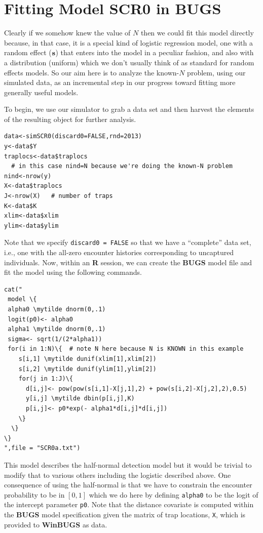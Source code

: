 \section{Fitting Model SCR0 in BUGS}
\label{scr0.sec.winbugs1}

Clearly if we somehow knew the value of $N$ then we could fit this
model directly because, in that case, it is a special kind of logistic
regression model, one with a random effect (${\bf s}$) that enters into the
model in a peculiar fashion, and also with a distribution (uniform)
which we don't usually think of as standard for random effects models.
So our aim here is to analyze the known-$N$ problem, using our
simulated data, as an incremental step in our progress toward fitting
more generally useful models.

To begin, we use our simulator to grab a data set and then harvest the
elements of the resulting object for further analysis.
\begin{verbatim}
data<-simSCR0(discard0=FALSE,rnd=2013)
y<-data$Y
traplocs<-data$traplocs
  # in this case nind=N because we're doing the known-N problem
nind<-nrow(y)
X<-data$traplocs
J<-nrow(X)   # number of traps
K<-data$K
xlim<-data$xlim
ylim<-data$ylim
\end{verbatim}

Note that we specify \mbox{\tt discard0 = FALSE} so that we have a
``complete'' data set, i.e., one with the all-zero encounter histories
corresponding to uncaptured individuals. Now, within an {\bf R} session, we
can create the {\bf BUGS} model file and fit the model using the following
commands.
{\small
\begin{Verbatim}[commandchars=\\\{\}]
cat("
 model \{
 alpha0 \mytilde dnorm(0,.1)
 logit(p0)<- alpha0
 alpha1 \mytilde dnorm(0,.1)
 sigma<- sqrt(1/(2*alpha1))
 for(i in 1:N)\{  # note N here because N is KNOWN in this example
    s[i,1] \mytilde dunif(xlim[1],xlim[2])
    s[i,2] \mytilde dunif(ylim[1],ylim[2])
    for(j in 1:J)\{
      d[i,j]<- pow(pow(s[i,1]-X[j,1],2) + pow(s[i,2]-X[j,2],2),0.5)
      y[i,j] \mytilde dbin(p[i,j],K)
      p[i,j]<- p0*exp(- alpha1*d[i,j]*d[i,j])
    \}
  \}
\}
",file = "SCR0a.txt")
\end{Verbatim}
}
This model describes the half-normal detection model but it
would be trivial to modify that to various others including the
logistic described above. One consequence of using the half-normal is
that we have to constrain the encounter probability to be in $[0,1]$
which we do here by defining \mbox{\tt alpha0} to be the logit of the
intercept parameter \mbox{\tt p0}. Note that the distance covariate is
computed within the {\bf BUGS} model specification given the matrix of trap
locations, \mbox{\tt X}, which is provided to {\bf WinBUGS} as data.

